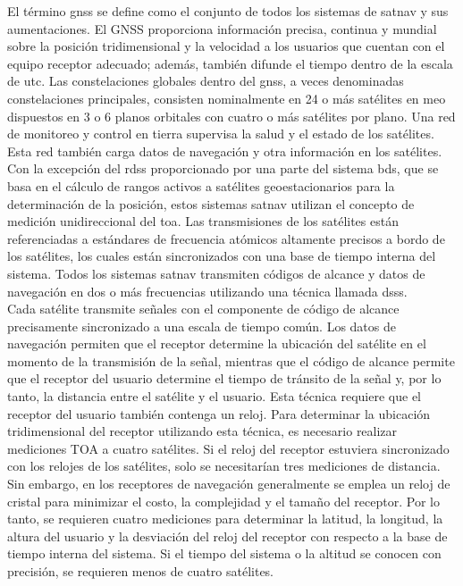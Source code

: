 \begin{justify}
    El término \gls{gnss} se define como el conjunto de todos los sistemas de \gls{satnav} y sus aumentaciones. El GNSS proporciona información precisa, continua y mundial
    sobre la posición tridimensional y la velocidad a los usuarios que cuentan con el equipo receptor adecuado; además, también difunde el tiempo dentro de la escala de \gls{utc}.
    Las constelaciones globales dentro del \gls{gnss}, a veces denominadas constelaciones principales, consisten nominalmente en 24 o más satélites en \gls{meo} dispuestos
    en 3 o 6 planos orbitales con cuatro o más satélites por plano. Una red de monitoreo y control en tierra supervisa la salud y el estado de los satélites.
    Esta red también carga datos de navegación y otra información en los satélites.\\

    Con la excepción del \gls{rdss} proporcionado por una parte del sistema \gls{bds}, que se basa en el cálculo de rangos activos a satélites geoestacionarios para la determinación
    de la posición, estos sistemas \gls{satnav} utilizan el concepto de medición unidireccional del \gls{toa}. Las transmisiones de los satélites están referenciadas a estándares
    de frecuencia atómicos altamente precisos a bordo de los satélites, los cuales están sincronizados con una base de tiempo interna del sistema. Todos los sistemas
    \gls{satnav} transmiten códigos de alcance y datos de navegación en dos o más frecuencias utilizando una técnica llamada \gls{dsss}.\\

    Cada satélite transmite señales con el componente de código de alcance precisamente sincronizado a una escala de tiempo común. Los datos de navegación permiten que el
    receptor determine la ubicación del satélite en el momento de la transmisión de la señal, mientras que el código de alcance permite que el receptor del usuario determine
    el tiempo de tránsito de la señal y, por lo tanto, la distancia entre el satélite y el usuario. Esta técnica requiere que el receptor del usuario también contenga un reloj.
    Para determinar la ubicación tridimensional del receptor utilizando esta técnica, es necesario realizar mediciones TOA a cuatro satélites. Si el reloj del receptor
    estuviera sincronizado con los relojes de los satélites, solo se necesitarían tres mediciones de distancia. Sin embargo, en los receptores de navegación generalmente
    se emplea un reloj de cristal para minimizar el costo, la complejidad y el tamaño del receptor. Por lo tanto, se requieren cuatro mediciones para determinar la latitud,
    la longitud, la altura del usuario y la desviación del reloj del receptor con respecto a la base de tiempo interna del sistema. Si el tiempo del sistema o la altitud se
    conocen con precisión, se requieren menos de cuatro satélites.
\end{justify}


